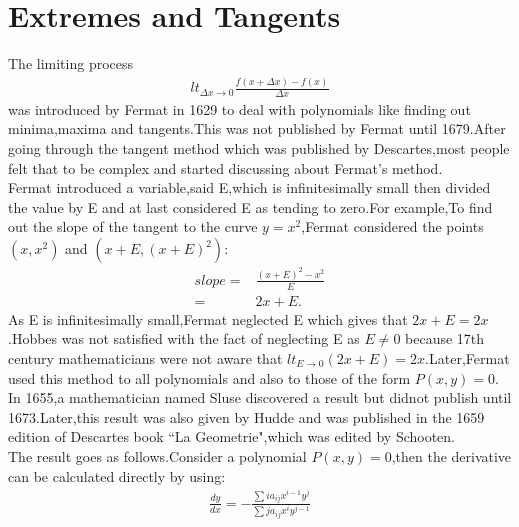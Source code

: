 \documentclass[a4paper,reqno,11pt]{book}
\theoremstyle{plain}%
\theoremstyle{definition}
\begin{document}
\section{Extremes and Tangents}
\noindent The limiting process
\begin{eqnarray*}
    lt_{\Delta x\to0}\frac{f(x+\Delta x)-f(x)}{\Delta x}
\end{eqnarray*}
was introduced by Fermat in 1629 to deal with polynomials like finding out minima,maxima and tangents.This was not published by Fermat until 1679.After going through the tangent method which was published by Descartes,most people felt that to be complex and started discussing about Fermat's method.\\
\indent Fermat introduced a variable,said E,which is infinitesimally small then divided the value by E and at last considered E as tending to zero.For example,To find out the slope of the tangent to the curve $y=x^2$,Fermat considered the points $(x,x^2)$ and $(x+E,(x+E)^2)$:
\begin{align*}
    slope=&\frac{(x+E)^2-x^2}{E}\\
         =&2x+E.
\end{align*}
As E is infinitesimally small,Fermat neglected E which gives that $2x+E=2x$.Hobbes was not satisfied with the fact of neglecting E as $E\neq 0$ because 17th century mathematicians were not aware that $lt_{E\to 0}(2x+E)=2x$.Later,Fermat used this method to all polynomials and also to those of the form $P(x,y)=0$.\\
\indent In 1655,a mathematician named Sluse discovered a result but didnot publish until 1673.Later,this result was also given by Hudde and was published in the 1659 edition of Descartes book ``La Geometrie",which was edited by Schooten.\\
\indent The result goes as follows.Consider a polynomial $P(x,y)=0$,then the derivative can be calculated directly by using:\\
\begin{eqnarray*}
    \frac{dy}{dx}=-\frac{\sum ia_{ij}x^{i-1}y^j}{\sum ja_{ij}x^iy^{j-1}}
\end{eqnarray*}
\end{document}

